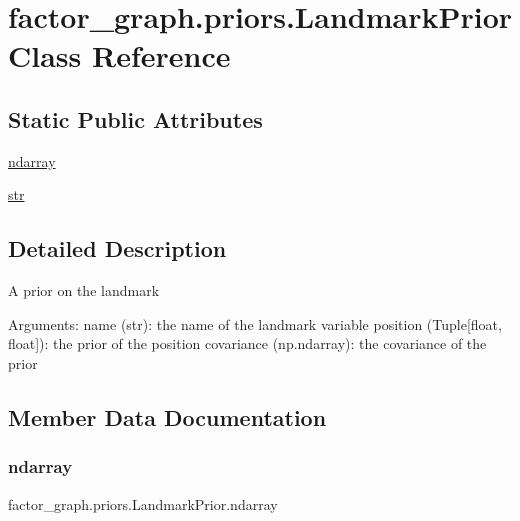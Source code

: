 \hypertarget{classfactor__graph_1_1priors_1_1LandmarkPrior}{}\section{factor\+\_\+graph.\+priors.\+Landmark\+Prior Class Reference}
\label{classfactor__graph_1_1priors_1_1LandmarkPrior}
\subsection*{Static Public Attributes}
\begin{DoxyCompactItemize}
\item
\hyperlink{classfactor__graph_1_1priors_1_1LandmarkPrior_a9042df677e53053172ccb79f713dcb37}{ndarray}
\item
\hyperlink{classfactor__graph_1_1priors_1_1LandmarkPrior_abc7f8dec4cb4c66c3985b7b6f1c60e9d}{str}
\end{DoxyCompactItemize}


\subsection{Detailed Description}
\begin{DoxyVerb}A prior on the landmark

Arguments:
    name (str): the name of the landmark variable
    position (Tuple[float, float]): the prior of the position
    covariance (np.ndarray): the covariance of the prior
\end{DoxyVerb}


\subsection{Member Data Documentation}
\mbox{\label{classfactor__graph_1_1priors_1_1LandmarkPrior_a9042df677e53053172ccb79f713dcb37}}
\subsubsection{\texorpdfstring{ndarray}{ndarray}}
{\footnotesize\ttfamily factor\+\_\+graph.\+priors.\+Landmark\+Prior.\+ndarray\hspace{0.3cm}{\ttfamily [static]}}


